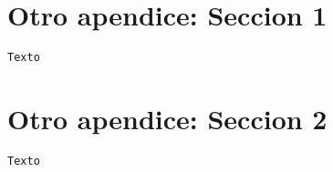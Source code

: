 \section{Otro apendice: Seccion 1}
\label{Apendice2:label}

\begin{center}
\begin{footnotesize}

\begin{verbatim}
Texto
\end{verbatim}

\end{footnotesize}
\end{center}

\section{Otro apendice: Seccion 2}
\label{Apendice2:label2}

\begin{center}
\begin{footnotesize}

\begin{verbatim}
Texto
\end{verbatim}


\end{footnotesize}
\end{center}
